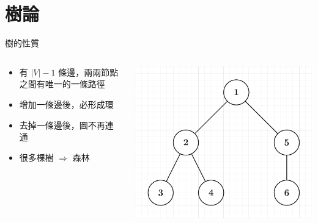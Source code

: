 \documentclass[aspectratio=169]{beamer}
\begin{document}
    \section{樹論}
    \begin{frame}{樹的性質}
        \begin{columns}
            \begin{column}{0.65\textwidth}
                \begin{itemize}
                    \item 有 $|V|-1$ 條邊，兩兩節點之間有唯一的一條路徑
                    \item 增加一條邊後，必形成環
                    \item 去掉一條邊後，圖不再連通
                    \item 很多棵樹 $\Rightarrow$ 森林
                \end{itemize}
            \end{column}
            \begin{column}{0.35\textwidth}
                \includegraphics[width=\textwidth]{images/tree.png}
            \end{column}
        \end{columns}
    \end{frame}
\end{document}
